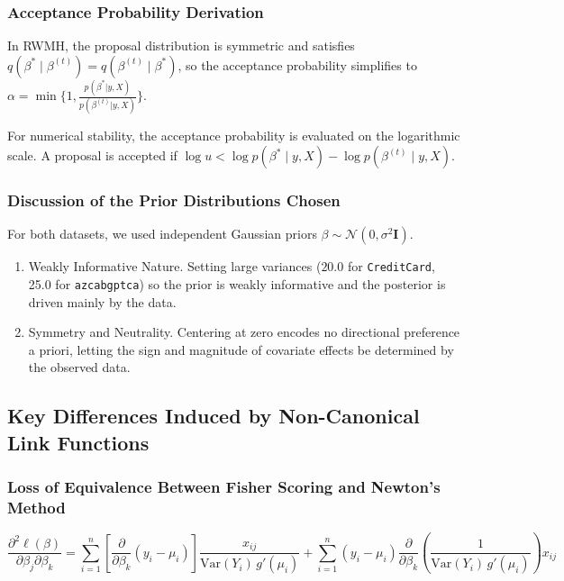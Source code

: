 \documentclass[11pt]{article}
\newcommand{\derivstep}[1]{%
  \par\medskip\noindent #1%
}
\begin{document}
\subsubsection{Acceptance Probability Derivation}\vspace{-2pt}

In RWMH, the proposal distribution is symmetric and satisfies $q(\beta^\ast \mid \beta^{(t)}) = q(\beta^{(t)} \mid \beta^\ast)$, so the acceptance probability simplifies to $\alpha = \min\{1, \frac{p(\beta^*|y,X)}{p(\beta^{(t)}|y,X)}\}$.
\derivstep{For numerical stability, the acceptance probability is evaluated on the
logarithmic scale. A proposal is accepted if }$\log u < \log p(\beta^\ast \mid y, X) - \log p(\beta^{(t)} \mid y, X)$.
\subsubsection{Discussion of the Prior Distributions Chosen}\vspace{-2pt}
For both datasets, we used independent Gaussian priors $\beta \sim \mathcal{N}(0, \sigma^2\mathbf{I})$.
\begin{enumerate}[itemsep=1pt, topsep=4pt]
  \item Weakly Informative Nature. Setting large variances ($20.0$ for \texttt{CreditCard}, 25.0 for \texttt{azcabgptca}) so the prior is weakly informative and the posterior is driven mainly by the data.
  \item Symmetry and Neutrality. Centering at zero encodes no directional preference a priori, letting the sign and magnitude of covariate effects be determined by the observed data.
\end{enumerate}

\subsection{Key Differences Induced by Non-Canonical Link Functions}
\subsubsection{Loss of Equivalence Between Fisher Scoring and Newton's Method}
\[
\frac{\partial^2 \ell(\beta)}{\partial \beta_j \partial \beta_k}
= \sum_{i=1}^n 
\left[
\frac{\partial}{\partial \beta_k}(y_i - \mu_i)
\right]
\frac{x_{ij}}{\mathrm{Var}(Y_i)\, g'(\mu_i)}
+
\sum_{i=1}^n
(y_i - \mu_i)
\frac{\partial}{\partial \beta_k}
\left(
\frac{1}{\mathrm{Var}(Y_i)\, g'(\mu_i)}
\right)
x_{ij}
\]
\end{document}
